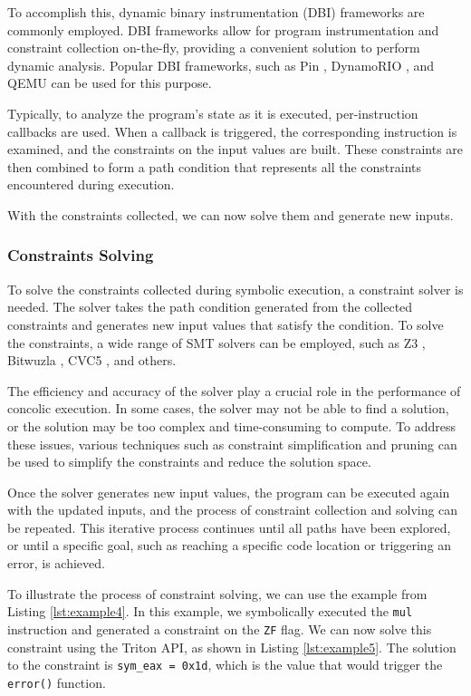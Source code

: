 To accomplish this, dynamic binary instrumentation (DBI) frameworks are commonly employed. DBI frameworks allow for program instrumentation and constraint collection on-the-fly, providing a convenient solution to perform dynamic analysis. Popular DBI frameworks, such as Pin \cite{pintool-2005}, DynamoRIO \cite{dynamorio-thesis}, and QEMU \cite{qemu-usenix2005} can be used for this purpose.

Typically, to analyze the program's state as it is executed, per-instruction callbacks are used. When a callback is triggered, the corresponding instruction is examined, and the constraints on the input values are built. These constraints are then combined to form a path condition that represents all the constraints encountered during execution.

With the constraints collected, we can now solve them and generate new inputs.

\subsubsection{Constraints Solving}

To solve the constraints collected during symbolic execution, a constraint solver is needed. The solver takes the path condition generated from the collected constraints and generates new input values that satisfy the condition. To solve the constraints, a wide range of SMT solvers can be employed, such as Z3 \cite{z3-smt-solver}, Bitwuzla \cite{bitwuza-smt-comp-2020}, CVC5 \cite{cvc5-smt-solver}, and others.

The efficiency and accuracy of the solver play a crucial role in the performance of concolic execution. In some cases, the solver may not be able to find a solution, or the solution may be too complex and time-consuming to compute. To address these issues, various techniques such as constraint simplification and pruning can be used to simplify the constraints and reduce the solution space.

Once the solver generates new input values, the program can be executed again with the updated inputs, and the process of constraint collection and solving can be repeated. This iterative process continues until all paths have been explored, or until a specific goal, such as reaching a specific code location or triggering an error, is achieved.

To illustrate the process of constraint solving, we can use the example from Listing \ref{lst:example4}. In this example, we symbolically executed the \texttt{mul} instruction and generated a constraint on the \texttt{ZF} flag. We can now solve this constraint using the Triton API, as shown in Listing \ref{lst:example5}. The solution to the constraint is \texttt{sym\_eax = 0x1d}, which is the value that would trigger the \texttt{error()} function.

